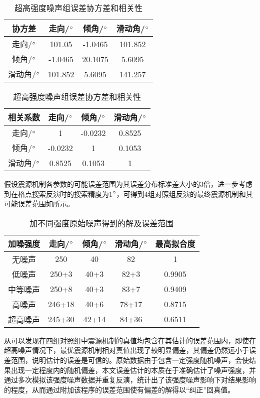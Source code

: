 \begin{table}[ht]
\centering
\caption{超高强度噪声组误差协方差和相关性}
\label{tab3_05}
    \begin{tabular}{c c c c}
    \hline
    协方差 & 走向/$^\circ$ & 倾角/$^\circ$ & 滑动角/$^\circ$ \\
    \hline
	走向/$^\circ$ 		&101.05 	&-1.0465	&101.852\\
	倾角/$^\circ$		&-1.0465	&20.1075	&5.6095\\
	滑动角/$^\circ$	&101.852	&5.6095		&141.257\\
    \hline
    \end{tabular}
    \begin{tabular}{c c c c}
    \hline
    相关系数 & 走向/$^\circ$ & 倾角/$^\circ$ & 滑动角/$^\circ$ \\
    \hline
	走向/$^\circ$ 		&1 			&-0.0232	&0.8525\\
	倾角/$^\circ$		&-0.0232	&1			&0.1053\\
	滑动角/$^\circ$	&0.8525		&0.1053		&1\\
    \hline
    \end{tabular}
\end{table}
假设震源机制各参数的可能误差范围为其误差分布标准差大小的3倍，进一步考虑到在格点搜索反演时的搜索精度为1$^\circ$，可得到4组对照组反演的最终震源机制和其可能误差范围如所示。
\begin{table}[ht]
\centering
\caption{加不同强度原始噪声得到的解及误差范围}
\label{tab3_06}
    \begin{tabular}{c c c c c}
    \hline
    加噪强度 & 走向/$^\circ$ & 倾角/$^\circ$ & 滑动角/$^\circ$ &最高拟合度 \\
    \hline
    无噪声		& 250 & 40 & 82  & 1\\
    低噪声		& 250+3 & 40+3 & 82+3 & 0.9905 \\
    中等噪声	& 250+8 & 40+3 & 83+7 & 0.9409 \\
    高噪声		& 246+18 & 40+6 & 78+17 & 0.8715 \\
    超高噪声	& 245+30 & 42+14 & 84+36 & 0.6511 \\
    \hline
    \end{tabular}
\end{table}

从可以发现在四组对照组中震源机制的真值均包含在其估计的误差范围内，即使在超高噪声情况下，最优震源机制相对真值出现了较明显偏差，其偏差仍然远小于误差范围，说明估计的误差是可信的。原始数据由于包含一定强度随机噪声，会使结果出现一定程度内的随机偏差，本文误差估计的本质在于准确估计了噪声强度，并通过多次模拟该强度噪声数据并重复反演，统计出了该强度噪声影响下对结果影响的程度，从而通过附加该程序的误差范围使有偏差的解得以“纠正”回真值。


